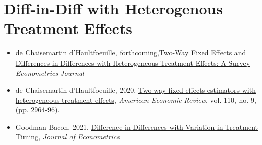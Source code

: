 \documentclass[a4paper,french,11pt]{article}
\begin{document}
\section{Diff-in-Diff with Heterogenous Treatment Effects}
\begin{itemize}

\item de Chaisemartin d'Haultfoeuille, forthcoming,\href{https://papers.ssrn.com/sol3/papers.cfm?abstract_id=3980758}{Two-Way Fixed Effects and Differences-in-Differences with Heterogeneous Treatment Effects: A Survey} \textit{ Econometrics Journal }

\item de Chaisemartin d'Haultfoeuille, 2020, \href{https://drive.google.com/file/d/1D93ltJUirR4zIqJZfSTwSLrA-6rSZpTJ/view?usp=sharing}{Two-way fixed effects estimators with heterogeneous treatment effects}, \textit{American Economic Review}, vol. 110, no. 9,(pp. 2964-96).

\item Goodman-Bacon, 2021, \href{https://drive.google.com/file/d/1gUg7INdzM9A1d1OqCFZjLg9a-BAxMBzf/view}{Difference-in-Differences with Variation in Treatment Timing}, \textit{Journal of Econometrics} 
\end{itemize}






\end{document}
